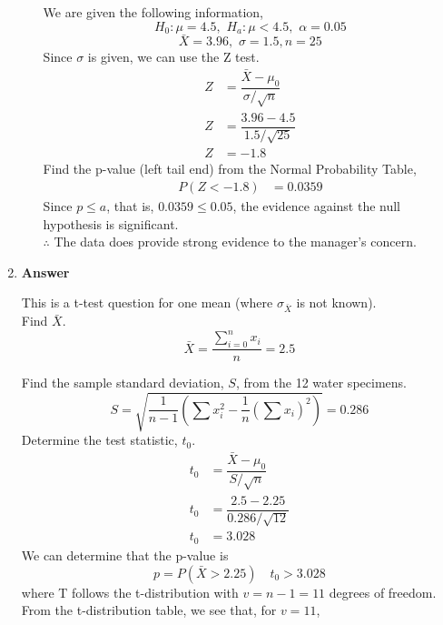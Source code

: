 \documentclass[12pt]{book}
\begin{document}
\begin{enumerate}
\begin{enumerate}
        We are given the following information,
        $$ H_0: \mu = 4.5, \,\, H_a: \mu < 4.5, \,\, \alpha = 0.05$$
        $$\bar{X} = 3.96, \,\, \sigma = 1.5, n = 25$$
        Since $\sigma$ is given, we can use the Z test.
        \begin{align*}
            Z &= \dfrac{\bar{X} - \mu_0}{\sigma / \sqrt{n}}\\
            Z &= \dfrac{3.96 - 4.5}{1.5 / \sqrt{25}}\\
            Z &= -1.8
        \end{align*}
        Find the p-value (left tail end) from the Normal Probability Table,
        \begin{align*}
            P(Z < -1.8) &= 0.0359
        \end{align*}
        Since $p \leq a$, that is, $0.0359 \leq 0.05$, the evidence against the null hypothesis is significant.\\
        
        $\therefore$ The data does provide strong evidence to the manager's concern.
        
    \end{enumerate}
    
    \newpage
    
    \item \textbf{Answer}
    
    This is a t-test question for one mean (where $\sigma_{\bar{X}}$ is not known).\\
    
    Find $\bar{X}$.
    $$\bar{X} = \dfrac{\sum_{i=0}^{n} x_i}{n} = 2.5$$
    
    Find the sample standard deviation, $S$, from the 12 water specimens.
    $$S = \sqrt{\dfrac{1}{n-1} \left(\sum x_{i}^2 - \dfrac{1}{n} \left(\sum x_{i}\right)^2\right)} = 0.286$$
    Determine the test statistic, $t_0$.
    \begin{align*}
            t_0 &= \dfrac{\bar{X} - \mu_0}{S / \sqrt{n}}\\
            t_0 &= \dfrac{2.5 - 2.25}{0.286 / \sqrt{12}}\\
            t_0 &= 3.028
    \end{align*}
    We can determine that the p-value is $$p = P(\bar{X} > 2.25) \quad t_0 > 3.028$$
    where T follows the t-distribution with $v = n - 1 = 11$ degrees of freedom. From the t-distribution table, we see that, for $v = 11$,\\
    

\end{enumerate}
\end{document}
